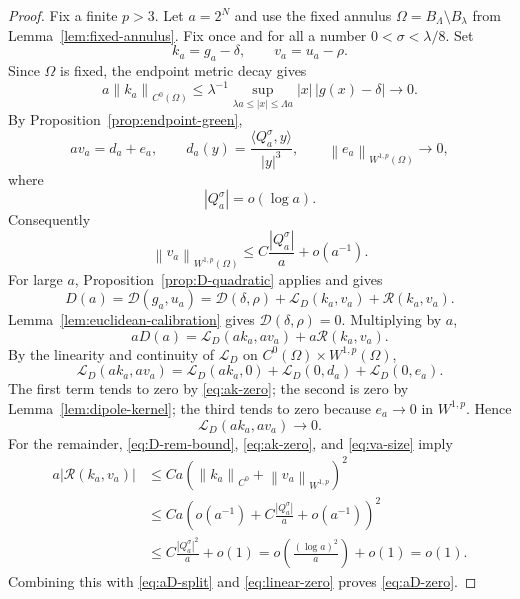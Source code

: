 \documentclass[11pt]{amsart}
\numberwithin{equation}{section}
\theoremstyle{definition}
\newcommand{\Dfun}{\mathscr D}
\newcommand{\rhoE}{\rho}
\newcommand{\LD}{\mathcal L_D}
\newcommand{\ip}[2]{\langle #1,#2\rangle}
\newcommand{\norm}[1]{\left\lVert #1\right\rVert}
\newcommand{\abs}[1]{\left\lvert #1\right\rvert}
\begin{document}
\begin{proof}
Fix a finite $p>3$.  Let $a=2^N$ and use the fixed annulus $\Omega=B_\Lambda\setminus B_\lambda$ from Lemma~\ref{lem:fixed-annulus}.  Fix once and for all a number $0<\sigma<\lambda/8$.  Set
$$
        k_a=g_a-\delta,
        \qquad v_a=u_a-\rhoE.
$$
Since $\Omega$ is fixed, the endpoint metric decay gives
\begin{equation}\label{eq:ak-zero}
        a\norm{k_a}_{C^0(\Omega)}
        \le \lambda^{-1}\sup_{\lambda a\le |x|\le \Lambda a}|x|\,|g(x)-\delta|\to0.
\end{equation}
By Proposition~\ref{prop:endpoint-green},
\begin{equation}\label{eq:av-expansion}
        a v_a=d_a+e_a,
        \qquad
        d_a(y)=\frac{\ip{Q_a^\sigma}{y}}{\abs y^3},
        \qquad
        \norm{e_a}_{W^{1,p}(\Omega)}\to0,
\end{equation}
where
\begin{equation}\label{eq:Qa-sublog}
        \abs{Q_a^\sigma}=o(\log a).
\end{equation}
Consequently
\begin{equation}\label{eq:va-size}
        \norm{v_a}_{W^{1,p}(\Omega)}
        \le C\frac{\abs{Q_a^\sigma}}{a}+o(a^{-1}).
\end{equation}
For large $a$, Proposition~\ref{prop:D-quadratic} applies and gives
$$
        D(a)=\Dfun(g_a,u_a)=\Dfun(\delta,\rhoE)+\LD(k_a,v_a)+\mathcal R(k_a,v_a).
$$
Lemma~\ref{lem:euclidean-calibration} gives $\Dfun(\delta,\rhoE)=0$.  Multiplying by $a$,
\begin{equation}\label{eq:aD-split}
        aD(a)=\LD(ak_a,av_a)+a\mathcal R(k_a,v_a).
\end{equation}
By the linearity and continuity of $\LD$ on $C^0(\Omega)\times W^{1,p}(\Omega)$,
$$
        \LD(ak_a,av_a)=\LD(ak_a,0)+\LD(0,d_a)+\LD(0,e_a).
$$
The first term tends to zero by \eqref{eq:ak-zero}; the second is zero by Lemma~\ref{lem:dipole-kernel}; the third tends to zero because $e_a\to0$ in $W^{1,p}$.  Hence
\begin{equation}\label{eq:linear-zero}
        \LD(ak_a,av_a)\to0.
\end{equation}
For the remainder, \eqref{eq:D-rem-bound}, \eqref{eq:ak-zero}, and \eqref{eq:va-size} imply
$$
\begin{aligned}
        a\abs{\mathcal R(k_a,v_a)}
        &\le Ca\left(\norm{k_a}_{C^0}+\norm{v_a}_{W^{1,p}}\right)^2              \\
        &\le Ca\left(o(a^{-1})+C\frac{\abs{Q_a^\sigma}}{a}+o(a^{-1})\right)^2           \\
        &\le C\frac{\abs{Q_a^\sigma}^2}{a}+o(1)
        =o\left(\frac{(\log a)^2}{a}\right)+o(1)=o(1).
\end{aligned}
$$
Combining this with \eqref{eq:aD-split} and \eqref{eq:linear-zero} proves \eqref{eq:aD-zero}.
\end{proof}
\end{document}

